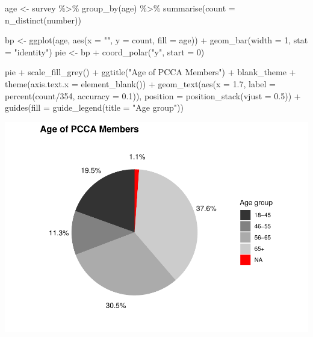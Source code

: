 \documentclass[
]{article}
\newenvironment{Shaded}{\begin{snugshade}}{\end{snugshade}}
\newcommand{\AttributeTok}[1]{\textcolor[rgb]{0.77,0.63,0.00}{#1}}
\newcommand{\DecValTok}[1]{\textcolor[rgb]{0.00,0.00,0.81}{#1}}
\newcommand{\FloatTok}[1]{\textcolor[rgb]{0.00,0.00,0.81}{#1}}
\newcommand{\FunctionTok}[1]{\textcolor[rgb]{0.00,0.00,0.00}{#1}}
\newcommand{\NormalTok}[1]{#1}
\newcommand{\OtherTok}[1]{\textcolor[rgb]{0.56,0.35,0.01}{#1}}
\newcommand{\SpecialCharTok}[1]{\textcolor[rgb]{0.00,0.00,0.00}{#1}}
\newcommand{\StringTok}[1]{\textcolor[rgb]{0.31,0.60,0.02}{#1}}
\begin{document}
\begin{Shaded}
\begin{Highlighting}[]
\NormalTok{age }\OtherTok{\textless{}{-}}\NormalTok{ survey }\SpecialCharTok{\%\textgreater{}\%}
    \FunctionTok{group\_by}\NormalTok{(age) }\SpecialCharTok{\%\textgreater{}\%}
    \FunctionTok{summarise}\NormalTok{(}\AttributeTok{count =} \FunctionTok{n\_distinct}\NormalTok{(number))}

\NormalTok{bp }\OtherTok{\textless{}{-}} \FunctionTok{ggplot}\NormalTok{(age, }\FunctionTok{aes}\NormalTok{(}\AttributeTok{x =} \StringTok{""}\NormalTok{, }\AttributeTok{y =}\NormalTok{ count, }\AttributeTok{fill =}\NormalTok{ age)) }\SpecialCharTok{+} \FunctionTok{geom\_bar}\NormalTok{(}\AttributeTok{width =} \DecValTok{1}\NormalTok{,}
    \AttributeTok{stat =} \StringTok{"identity"}\NormalTok{)}
\NormalTok{pie }\OtherTok{\textless{}{-}}\NormalTok{ bp }\SpecialCharTok{+} \FunctionTok{coord\_polar}\NormalTok{(}\StringTok{"y"}\NormalTok{, }\AttributeTok{start =} \DecValTok{0}\NormalTok{)}

\NormalTok{pie }\SpecialCharTok{+} \FunctionTok{scale\_fill\_grey}\NormalTok{() }\SpecialCharTok{+} \FunctionTok{ggtitle}\NormalTok{(}\StringTok{"Age of PCCA Members"}\NormalTok{) }\SpecialCharTok{+}\NormalTok{ blank\_theme }\SpecialCharTok{+}
    \FunctionTok{theme}\NormalTok{(}\AttributeTok{axis.text.x =} \FunctionTok{element\_blank}\NormalTok{()) }\SpecialCharTok{+} \FunctionTok{geom\_text}\NormalTok{(}\FunctionTok{aes}\NormalTok{(}\AttributeTok{x =} \FloatTok{1.7}\NormalTok{,}
    \AttributeTok{label =} \FunctionTok{percent}\NormalTok{(count}\SpecialCharTok{/}\DecValTok{354}\NormalTok{, }\AttributeTok{accuracy =} \FloatTok{0.1}\NormalTok{)), }\AttributeTok{position =} \FunctionTok{position\_stack}\NormalTok{(}\AttributeTok{vjust =} \FloatTok{0.5}\NormalTok{)) }\SpecialCharTok{+}
    \FunctionTok{guides}\NormalTok{(}\AttributeTok{fill =} \FunctionTok{guide\_legend}\NormalTok{(}\AttributeTok{title =} \StringTok{"Age group"}\NormalTok{))}
\end{Highlighting}
\end{Shaded}

\includegraphics{pcca_survey_files/figure-latex/age-all-1.pdf}
\end{document}
